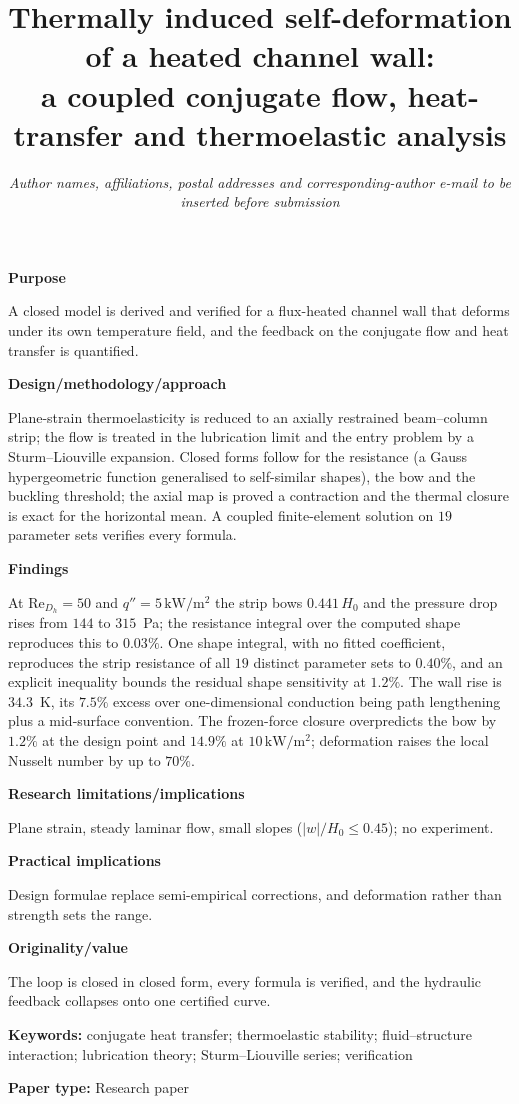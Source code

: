 \documentclass[11pt,a4paper]{article}
\title{\bfseries Thermally induced self-deformation of a heated channel wall:\\
a coupled conjugate flow, heat-transfer and thermoelastic analysis}
\author{%
  \normalsize\textit{Author names, affiliations, postal addresses and
  corresponding-author e-mail to be inserted before submission}%
}
\date{}
\newcommand{\ReDh}{\mathrm{Re}_{D_h}}
\newcommand{\abshead}[1]{\par\vspace{5pt}\noindent\textbf{#1}\par\nobreak\vspace{1pt}}
\newenvironment{structuredabstract}%
  {\par\small\setlength{\parindent}{0pt}\setlength{\parskip}{2pt}}%
  {\par\medskip}
\begin{document}
\maketitle
\thispagestyle{empty}

\begin{structuredabstract}
\abshead{Purpose}
A closed model is derived and verified for a flux-heated channel wall that deforms under its
own temperature field, and the feedback on the conjugate flow and heat transfer is quantified.

\abshead{Design/methodology/approach}
Plane-strain thermoelasticity is reduced to an axially restrained beam--column strip; the flow
is treated in the lubrication limit and the entry problem by a Sturm--Liouville expansion.
Closed forms follow for the resistance (a Gauss hypergeometric function generalised to
self-similar shapes), the bow and the buckling threshold; the axial map is proved a contraction
and the thermal closure is exact for the horizontal mean. A coupled finite-element solution on
$19$ parameter sets verifies every formula.

\abshead{Findings}
At $\ReDh=50$ and $q''=5\,\mathrm{kW/m^2}$ the strip bows $0.441\,H_0$ and the pressure drop
rises from $144$ to $315$~Pa; the resistance integral over the computed shape reproduces this
to $0.03\%$. One shape integral, with no fitted coefficient, reproduces the strip resistance of
all $19$ distinct parameter sets to $0.40\%$, and an explicit inequality bounds the residual
shape sensitivity at $1.2\%$. The
wall rise is $34.3$~K, its $7.5\%$ excess over one-dimensional conduction being path
lengthening plus a mid-surface convention. The frozen-force closure overpredicts the bow by
$1.2\%$ at the design point and $14.9\%$ at $10\,\mathrm{kW/m^2}$; deformation raises the local
Nusselt number by up to $70\%$.

\abshead{Research limitations/implications}
Plane strain, steady laminar flow, small slopes ($|w|/H_0\le0.45$); no experiment.

\abshead{Practical implications}
Design formulae replace semi-empirical corrections, and deformation rather than strength sets
the range.

\abshead{Originality/value}
The loop is closed in closed form, every formula is verified, and the hydraulic feedback
collapses onto one certified curve.

\vspace{3pt}
\noindent\textbf{Keywords:} conjugate heat transfer; thermoelastic stability;
fluid--structure interaction; lubrication theory; Sturm--Liouville series;
verification

\vspace{2pt}
\noindent\textbf{Paper type:} Research paper
\end{structuredabstract}
\end{document}
